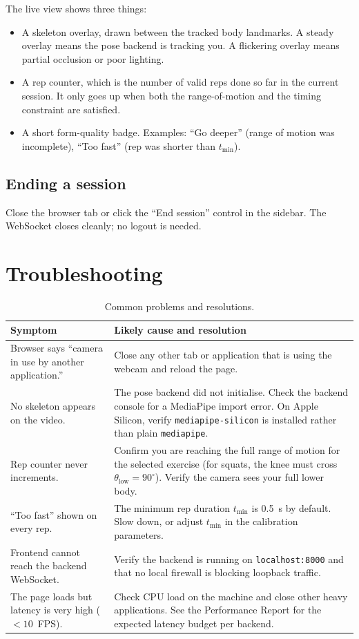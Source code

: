 \documentclass{article}
\begin{document}
The live view shows three things:

\begin{itemize}
  \item A skeleton overlay, drawn between the tracked body landmarks.
    A steady overlay means the pose backend is tracking you. A
    flickering overlay means partial occlusion or poor lighting.
  \item A rep counter, which is the number of valid reps done so far
    in the current session. It only goes up when both the
    range-of-motion and the timing constraint are satisfied.
  \item A short form-quality badge. Examples: ``Go deeper''
    (range of motion was incomplete), ``Too fast'' (rep was
    shorter than $t_{\min}$).
\end{itemize}

\subsection{Ending a session}

Close the browser tab or click the ``End session'' control in the
sidebar. The WebSocket closes cleanly; no logout is needed.

\section{Troubleshooting}

\begin{table}[h]
\centering
\begin{tabularx}{\textwidth}{p{5cm} X}
\toprule
\textbf{Symptom} & \textbf{Likely cause and resolution}\\
\midrule
Browser says ``camera in use by another application.'' &
  Close any other tab or application that is using the webcam and
  reload the page.\\
No skeleton appears on the video. &
  The pose backend did not initialise. Check the backend console
  for a MediaPipe import error. On Apple Silicon, verify
  \texttt{mediapipe-silicon} is installed rather than plain
  \texttt{mediapipe}.\\
Rep counter never increments. &
  Confirm you are reaching the full range of motion for the selected
  exercise (for squats, the knee must cross
  $\theta_{\text{low}} = 90^\circ$). Verify the camera sees your full
  lower body.\\
``Too fast'' shown on every rep. &
  The minimum rep duration $t_{\min}$ is 0.5~s by default. Slow down,
  or adjust $t_{\min}$ in the calibration parameters.\\
Frontend cannot reach the backend WebSocket. &
  Verify the backend is running on
  \texttt{localhost:8000} and that no local firewall is blocking
  loopback traffic.\\
The page loads but latency is very high ($<10$~FPS). &
  Check CPU load on the machine and close other heavy applications.
  See the Performance Report for the expected latency budget per
  backend.\\
\bottomrule
\end{tabularx}
\caption{Common problems and resolutions.}
\label{tab:trouble}
\end{table}
\end{document}
